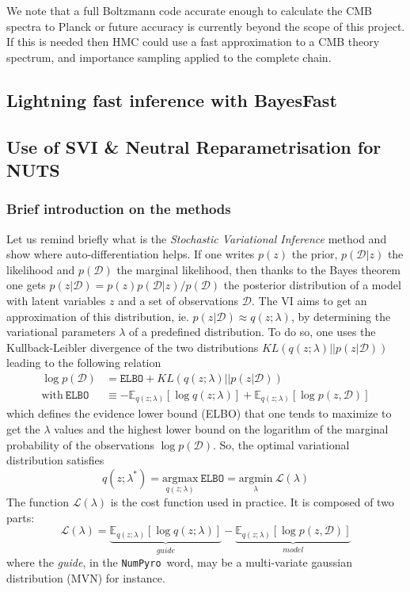 \documentclass[final,5p,times,twocolumn,authoryear]{elsarticle}
\newcommand{\numpyro}{\texttt{NumPyro}}
\begin{document}
We note that a full Boltzmann code accurate enough to calculate the CMB spectra to Planck \citep{planck18}
or future \citep{s4,simons} accuracy is currently beyond the scope of this project.  
If this is needed then HMC could use a fast approximation to a CMB theory spectrum, and importance sampling applied to the complete chain.


\subsection{Lightning fast inference with BayesFast}

%
\subsection{Use of SVI \& Neutral Reparametrisation for NUTS}
\subsubsection{Brief introduction on the methods}
%
Let us remind briefly what is the \textit{Stochastic Variational Inference} method \citep{2012arXiv1206.7051H, 2017arXiv171105597Z} and show where auto-differentiation helps. If one  writes $p(z)$ the prior, $p(\mathcal{D}|z)$ the likelihood and $p(\mathcal{D})$ the marginal likelihood, then thanks to the  Bayes theorem one gets $p(z|\mathcal{D})=p(z)p(\mathcal{D}|z)/p(\mathcal{D})$ the posterior distribution of a model with latent variables $z$ and a set of observations $\mathcal{D}$. The VI aims to get an approximation of this distribution, ie. $p(z|\mathcal{D}) \approx q(z;\lambda)$, by determining the variational parameters $\lambda$ of a predefined distribution. To do so, one uses the Kullback-Leibler divergence of the two distributions $KL(q(z;\lambda)||p(z|\mathcal{D}))$ leading to the following relation
\begin{align}
\log p(\mathcal{D}) &= \mathtt{ELBO} +  KL(q(z;\lambda)||p(z|\mathcal{D})) \label{eq-ELBO} \\
\mathrm{with} \ \mathtt{ELBO} &\equiv -\mathbb{E}_{q(z;\lambda)}\left[ \log q(z;\lambda)\right] + \mathbb{E}_{q(z;\lambda)}\left[ \log p(z,\mathcal{D}) \right] 
\end{align}
which defines the evidence lower bound (ELBO) that one tends to maximize to get the $\lambda$ values and the  highest lower bound on the logarithm of the marginal probability of the observations $\log p(\mathcal{D})$. So, the optimal variational distribution satisfies
\begin{equation}
q(z;\lambda^\ast) = \underset{q(z;\lambda)}{\mathrm{argmax}}\  \mathtt{ELBO} = 
\underset{\lambda}{\mathrm{argmin}}\ \mathcal{L}(\lambda)
\end{equation}
The function $\mathcal{L}(\lambda)$ is the cost function used in practice. It is composed of two parts:
\begin{equation}
\mathcal{L}(\lambda) = \underbrace{\mathbb{E}_{q(z;\lambda)}\left[ \log q(z;\lambda)\right]}_{guide} - \underbrace{\mathbb{E}_{q(z;\lambda)}\left[ \log p(z,\mathcal{D}) \right]}_{model}
\label{eq-loss-svi-1}
\end{equation}
where the \textit{guide}, in the \numpyro\ word, may be a multi-variate gaussian distribution (MVN) for instance. 
\end{document}
